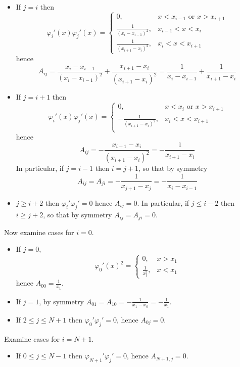\documentclass{article}
\newcommand{\vp}{\varphi}
\begin{document}
\begin{enumerate}[label=(\alph*)]
\begin{itemize}
	\item If $j=i$ then
	$$\vp_i'(x)\vp_j'(x) =
	\begin{cases}
		0, & x< x_{i-1} \text{ or } x> x_{i+1}\\
		\frac{1}{(x_i-x_{i-1})^2}, & x_{i-1}<x<x_i\\
		\frac{1}{(x_{i+1}-x_i)^2}, & x_i<x<x_{i+1}
	\end{cases}$$
	hence
	$$A_{ij} = \frac{x_i-x_{i-1}}{(x_i-x_{i-1})^2} + \frac{x_{i+1}-x_i}{(x_{i+1}-x_i)^2}
	= \frac{1}{x_i-x_{i-1}} + \frac{1}{x_{i+1}-x_i}$$
	
	\item If $j=i+1$ then
	$$\vp_i'(x)\vp_j'(x) =
	\begin{cases}
		0, & x< x_i \text{ or } x> x_{i+1}\\
		-\frac{1}{(x_{i+1}-x_{i})^2}, & x_i<x<x_{i+1}\\
	\end{cases}$$
	hence
	$$A_{ij} = -\frac{x_{i+1}-x_i}{(x_{i+1}-x_{i})^2} = -\frac{1}{x_{i+1}-x_{i}}$$
	In particular, if $j=i-1$ then $i=j+1$, so that by symmetry
	$$A_{ij} = A_{ji} = -\frac{1}{x_{j+1}-x_j} = -\frac{1}{x_i-x_{i-1}}$$
	
	\item $j\ge i+2$ then $\vp_i'\vp_j'=0$ hence $A_{ij}=0$. In particular, if $j\le i-2$ then $i\ge j+2$, so that by symmetry $A_{ij}=A_{ji}=0$.
	
\end{itemize}

Now examine cases for $i=0$.
\begin{itemize}
	
	\item If $j=0$,
	$$\vp_0'(x)^2 =
	\begin{cases}
		0, & x>x_1\\
		\frac{1}{x_1^2}, & x<x_1
	\end{cases}$$
	hence $A_{00}=\frac{1}{x_1}$.
	
	\item If $j=1$, by symmetry $A_{01} = A_{10} = -\frac{1}{x_1-x_0} = -\frac{1}{x_1}$.
	
	\item If $2\le j\le N+1$ then $\vp_0'\vp_j'=0$, hence $A_{0j}=0$.
	
\end{itemize}

Examine cases for $i=N+1$.
\begin{itemize}
	
	\item If $0\le j\le N-1$ then $\vp_{N+1}'\vp_j'=0$, hence $A_{N+1,j}=0$.
	

\end{itemize}
\end{enumerate}
\end{document}
